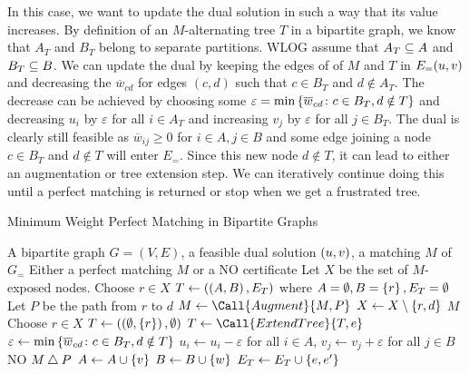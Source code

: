 In this case, we want to update the dual solution in such a way that its value increases. 
By definition of an $M$-alternating tree $T$ in a bipartite graph, we know that $A_T$ and $B_T$ belong to separate partitions. WLOG assume that $A_T \sse A$ and $B_T \sse B$. 
We can update the dual by keeping the edges of of $M$ and $T$ in $\f[E_=]{u, v}$ and decreasing the $\overline{w}_{cd}$ for edges $(c, d)$ such that $c \in B_T$ and $d \notin A_T$. 
The decrease can be achieved by choosing some $\varepsilon = \min \lrc{\overline{w}_{cd} \colon c \in B_T, d \notin T}$
and decreasing $u_i$ by $\varepsilon$ for all $i \in A_T$ and increasing $v_j$ by $\varepsilon$ for all $j \in B_T$. 
The dual is clearly still feasible as $\overline{w}_{ij} \geq 0$ for $i \in A, j \in B$ and some edge
joining a node $c \in B_T$ and $d \notin T$ will enter $E_=$. Since this new node $d \notin T$, it can lead to either an augmentation or 
tree extension step. We can iteratively continue doing this until a perfect matching is returned 
or stop when we get a frustrated tree. 

\begin{algorithm}[!h]
    \caption{Minimum Weight Perfect Matching in Bipartite Graphs} \label{alg:min_weight_perf_match_bi}  
    \begin{algorithmic}[1]
        \Algin A bipartite graph $G = (V, E)$, a feasible dual solution $\lrp{u, v}$, a matching $M$ of $G_=$
        \Algout Either a perfect matching $M$ or a NO certificate
        \State Let $X$ be the set of $M$-exposed nodes. Choose $r \in X$
        \State $T \gets \lrp{\lrp{A, B}, E_T}$ where $A = \emptyset, B = \lrc{r}, E_T = \emptyset$  
                    \State Let $P$ be the path from $r$ to $d$  
                    \State $M \gets \Call{Augment}{M, P}$
                    \State $X \gets X \sm \lrc{r, d}$
                        \State \Return $M$ 
                    \Else 
                        \State Choose $r \in X$
                        \State $T \gets \lrp{\lrp{\emptyset, \lrc{r}}, \emptyset}$ 
                    \EndIf 
                \Else 
                    \State $T \gets \Call{ExtendTree}{T, e}$
                \EndIf
            \EndWhile
            \State $\varepsilon \gets \min \lrc{\overline{w}_{cd} \colon c \in B_T, d \notin T}$
            \State $u_i \gets u_i - \varepsilon$ for all $i \in A$, $v_j \gets v_j + \varepsilon$ for all $j \in B$
        \EndWhile
        \State \Return NO 
        \Statex
            \State \Return $ M \symdiff P$
        \EndProcedure
        \Statex
                \State $A \gets A \cup \lrc{v}$
                \State $B \gets B \cup \lrc{w}$    
                \State $E_T \gets E_T \cup \lrc{e, e^\prime}$
            \EndIf
        \EndProcedure
    \end{algorithmic}
\end{algorithm}


